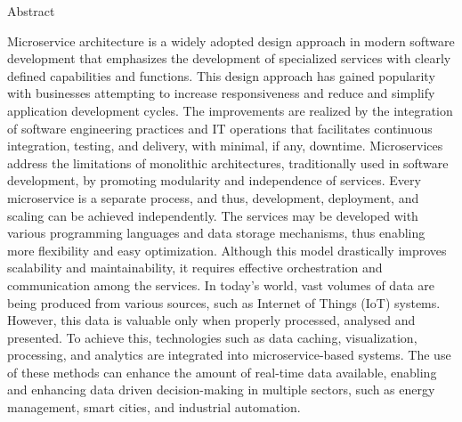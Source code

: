 \pagestyle{plain}
\begin{center}
{\LARGE Abstract}\\[1cm]
\end{center}

Microservice architecture is a widely adopted design approach in modern software development that emphasizes the development of specialized services with clearly defined capabilities and functions. This design approach has gained popularity with businesses attempting to increase responsiveness and reduce and simplify application development cycles. The improvements are realized by the integration of software engineering practices and IT operations that facilitates continuous integration, testing, and delivery, with minimal, if any, downtime. Microservices address the limitations of monolithic architectures, traditionally used in software development, by promoting modularity and independence of services. Every microservice is a separate process, and thus, development, deployment, and scaling can be achieved independently. The services may be developed with various programming languages and data storage mechanisms, thus enabling more flexibility and easy optimization. Although this model drastically improves scalability and maintainability, it requires effective orchestration and communication among the services. In today's world, vast volumes of data are being produced from various sources, such as Internet of Things (IoT) systems. However, this data is valuable only when properly processed, analysed and presented. To achieve this, technologies such as data caching, visualization, processing, and analytics are integrated into microservice-based systems. The use of these methods can enhance the amount of real-time data available, enabling and enhancing data driven decision-making in multiple sectors, such as energy management, smart cities, and industrial automation.